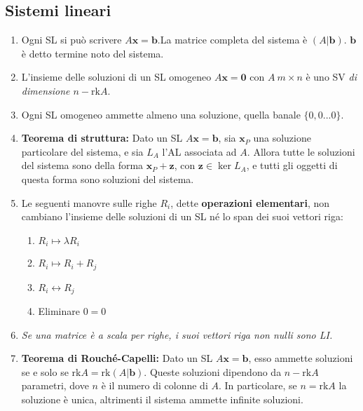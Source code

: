 \documentclass[draft]{article}
\newcommand{\bl}[1]{\mathbf{#1}}
\begin{document}
\subsection{Sistemi lineari}
\begin{enumerate}

\item Ogni SL si può scrivere $A \bl{x}= \bl{b}$.La matrice completa del sistema è $(A|\bl{b})$. $\bl{b}$ è detto termine noto del sistema.  

\item L'insieme delle soluzioni di un SL omogeneo $A \bl{x} =\bl{0}$ con $A \ m \times n$ è uno SV \textit{di dimensione $n-\mathrm{rk}A$}.

\item Ogni SL omogeneo ammette almeno una soluzione, quella banale $\{0,0...0\}$.

\item \textbf{Teorema di struttura:} Dato un SL $A \bl{x}= \bl{b}$, sia $\bl{x}_P$ una soluzione particolare del sistema, e sia $L_A$ l'AL associata ad $A$. Allora tutte le soluzioni del sistema sono della forma $\bl{x}_P + \bl{z}$, con $\bl{z} \in \ker L_A$, e tutti gli oggetti di questa forma sono soluzioni del sistema.

\item Le seguenti manovre sulle righe $R_i$, dette \textbf{operazioni elementari}, non cambiano l'insieme delle soluzioni di un SL né lo span dei suoi vettori riga:
\begin{enumerate}
\item $R_i \mapsto \lambda R_i $
\item $R_i \mapsto R_i + R_j $
\item $R_i \leftrightarrow R_j $
\item Eliminare $0=0$
\end{enumerate}

\item \textit{Se una matrice è a scala per righe, i suoi vettori riga non nulli sono LI.}

\item \textbf{Teorema di Rouché-Capelli:} Dato un SL $A \bl{x}= \bl{b}$, esso ammette soluzioni se e solo se $\mathrm{rk}A=\mathrm{rk}(A|\bl{b})$. Queste soluzioni dipendono da $n-\mathrm{rk}A$ parametri, dove $n$ è il numero di colonne di $A$. In particolare, se $n= \mathrm{rk} A$ la soluzione è unica, altrimenti il sistema ammette infinite soluzioni.

\end{enumerate}
\end{document}

